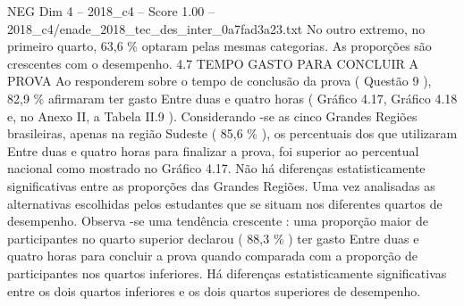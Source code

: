 \begin{textsample}{NEG Dim 4 – 2018\_c4 – Score 1.00 – 2018\_c4/enade\_2018\_tec\_des\_inter\_0a7fad3a23.txt}
No outro extremo, no primeiro quarto, 63,6 \% optaram pelas mesmas categorias.
As proporções são crescentes com o desempenho. 4.7 TEMPO GASTO PARA CONCLUIR A PROVA Ao responderem sobre o tempo de conclusão da prova ( Questão 9 ), 82,9 \% afirmaram ter gasto Entre duas e quatro horas ( Gráfico 4.17, Gráfico 4.18 e, no Anexo II, a Tabela II.9 ).
Considerando -se as cinco Grandes Regiões brasileiras, apenas na região Sudeste ( 85,6 \% ), os percentuais dos que utilizaram Entre duas e quatro horas para finalizar a prova, foi superior ao percentual nacional como mostrado no Gráfico 4.17.
Não há diferenças estatisticamente significativas entre as proporções das Grandes Regiões.
Uma vez analisadas as alternativas escolhidas pelos estudantes que se situam nos diferentes quartos de desempenho.
Observa -se uma tendência crescente : uma proporção maior de participantes no quarto superior declarou ( 88,3 \% ) ter gasto Entre duas e quatro horas para concluir a prova quando comparada com a proporção de participantes nos quartos inferiores.
Há diferenças estatisticamente significativas entre os dois quartos inferiores e os dois quartos superiores de desempenho.

\end{textsample}
